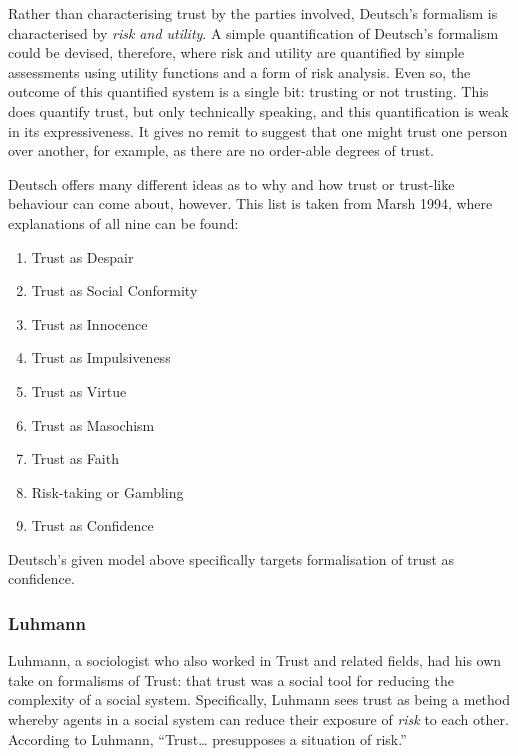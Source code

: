 Rather than characterising trust by the parties involved, Deutsch's formalism is characterised by \emph{risk and utility}. A simple quantification of Deutsch's formalism could be devised, therefore, where risk and utility are quantified by simple assessments using utility functions and a form of risk analysis. Even so, the outcome of this quantified system is a single bit: trusting or not trusting. This does quantify trust, but only technically speaking, and this quantification is weak in its expressiveness. It gives no remit to suggest that one might trust one person over another, for example, as there are no order-able degrees of trust.

Deutsch offers many different ideas as to why and how trust or trust-like behaviour can come about, however. This list is taken from Marsh 1994\cite{Marsh1994FormalisingConcept}, where explanations of all nine can be found:

\begin{enumerate}
    \item Trust as Despair
    \item Trust as Social Conformity
    \item Trust as Innocence
    \item Trust as Impulsiveness
    \item Trust as Virtue
    \item Trust as Masochism
    \item Trust as Faith
    \item Risk-taking or Gambling
    \item Trust as Confidence
\end{enumerate}

Deutsch's given model above specifically targets formalisation of trust as confidence.

\subsubsection{Luhmann}
Luhmann, a sociologist who also worked in Trust and related fields, had his own take on formalisms of Trust: that trust was a social tool for reducing the complexity of a social system. Specifically, Luhmann sees trust as being a method whereby agents in a social system can reduce their exposure of \emph{risk} to each other. According to Luhmann, ``Trust{\ldots} presupposes a situation of risk.''\cite{luhmann2000familiarity}\par

